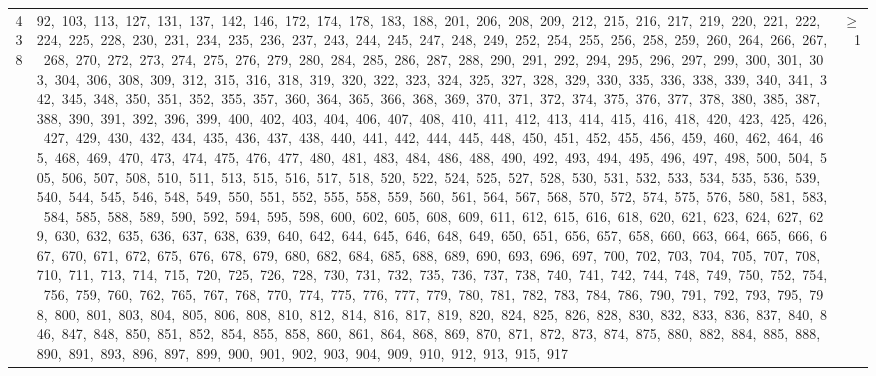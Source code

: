 \begin{longtable}{c|p{}|r}
438 & 92,\ 103,\ 113,\ 127,\ 131,\ 137,\ 142,\ 146,\ 172,\ 174,\ 178,\ 183,\ 188,\ 201,\ 206,\ 208,\ 209,\ 212,\ 215,\ 216,\ 217,\ 219,\ 220,\ 221,\ 222,\ 224,\ 225,\ 228,\ 230,\ 231,\ 234,\ 235,\ 236,\ 237,\ 243,\ 244,\ 245,\ 247,\ 248,\ 249,\ 252,\ 254,\ 255,\ 256,\ 258,\ 259,\ 260,\ 264,\ 266,\ 267,\ 268,\ 270,\ 272,\ 273,\ 274,\ 275,\ 276,\ 279,\ 280,\ 284,\ 285,\ 286,\ 287,\ 288,\ 290,\ 291,\ 292,\ 294,\ 295,\ 296,\ 297,\ 299,\ 300,\ 301,\ 303,\ 304,\ 306,\ 308,\ 309,\ 312,\ 315,\ 316,\ 318,\ 319,\ 320,\ 322,\ 323,\ 324,\ 325,\ 327,\ 328,\ 329,\ 330,\ 335,\ 336,\ 338,\ 339,\ 340,\ 341,\ 342,\ 345,\ 348,\ 350,\ 351,\ 352,\ 355,\ 357,\ 360,\ 364,\ 365,\ 366,\ 368,\ 369,\ 370,\ 371,\ 372,\ 374,\ 375,\ 376,\ 377,\ 378,\ 380,\ 385,\ 387,\ 388,\ 390,\ 391,\ 392,\ 396,\ 399,\ 400,\ 402,\ 403,\ 404,\ 406,\ 407,\ 408,\ 410,\ 411,\ 412,\ 413,\ 414,\ 415,\ 416,\ 418,\ 420,\ 423,\ 425,\ 426,\ 427,\ 429,\ 430,\ 432,\ 434,\ 435,\ 436,\ 437,\ 438,\ 440,\ 441,\ 442,\ 444,\ 445,\ 448,\ 450,\ 451,\ 452,\ 455,\ 456,\ 459,\ 460,\ 462,\ 464,\ 465,\ 468,\ 469,\ 470,\ 473,\ 474,\ 475,\ 476,\ 477,\ 480,\ 481,\ 483,\ 484,\ 486,\ 488,\ 490,\ 492,\ 493,\ 494,\ 495,\ 496,\ 497,\ 498,\ 500,\ 504,\ 505,\ 506,\ 507,\ 508,\ 510,\ 511,\ 513,\ 515,\ 516,\ 517,\ 518,\ 520,\ 522,\ 524,\ 525,\ 527,\ 528,\ 530,\ 531,\ 532,\ 533,\ 534,\ 535,\ 536,\ 539,\ 540,\ 544,\ 545,\ 546,\ 548,\ 549,\ 550,\ 551,\ 552,\ 555,\ 558,\ 559,\ 560,\ 561,\ 564,\ 567,\ 568,\ 570,\ 572,\ 574,\ 575,\ 576,\ 580,\ 581,\ 583,\ 584,\ 585,\ 588,\ 589,\ 590,\ 592,\ 594,\ 595,\ 598,\ 600,\ 602,\ 605,\ 608,\ 609,\ 611,\ 612,\ 615,\ 616,\ 618,\ 620,\ 621,\ 623,\ 624,\ 627,\ 629,\ 630,\ 632,\ 635,\ 636,\ 637,\ 638,\ 639,\ 640,\ 642,\ 644,\ 645,\ 646,\ 648,\ 649,\ 650,\ 651,\ 656,\ 657,\ 658,\ 660,\ 663,\ 664,\ 665,\ 666,\ 667,\ 670,\ 671,\ 672,\ 675,\ 676,\ 678,\ 679,\ 680,\ 682,\ 684,\ 685,\ 688,\ 689,\ 690,\ 693,\ 696,\ 697,\ 700,\ 702,\ 703,\ 704,\ 705,\ 707,\ 708,\ 710,\ 711,\ 713,\ 714,\ 715,\ 720,\ 725,\ 726,\ 728,\ 730,\ 731,\ 732,\ 735,\ 736,\ 737,\ 738,\ 740,\ 741,\ 742,\ 744,\ 748,\ 749,\ 750,\ 752,\ 754,\ 756,\ 759,\ 760,\ 762,\ 765,\ 767,\ 768,\ 770,\ 774,\ 775,\ 776,\ 777,\ 779,\ 780,\ 781,\ 782,\ 783,\ 784,\ 786,\ 790,\ 791,\ 792,\ 793,\ 795,\ 798,\ 800,\ 801,\ 803,\ 804,\ 805,\ 806,\ 808,\ 810,\ 812,\ 814,\ 816,\ 817,\ 819,\ 820,\ 824,\ 825,\ 826,\ 828,\ 830,\ 832,\ 833,\ 836,\ 837,\ 840,\ 846,\ 847,\ 848,\ 850,\ 851,\ 852,\ 854,\ 855,\ 858,\ 860,\ 861,\ 864,\ 868,\ 869,\ 870,\ 871,\ 872,\ 873,\ 874,\ 875,\ 880,\ 882,\ 884,\ 885,\ 888,\ 890,\ 891,\ 893,\ 896,\ 897,\ 899,\ 900,\ 901,\ 902,\ 903,\ 904,\ 909,\ 910,\ 912,\ 913,\ 915,\ 917 & $\ge$ 1 \\

\end{longtable}

